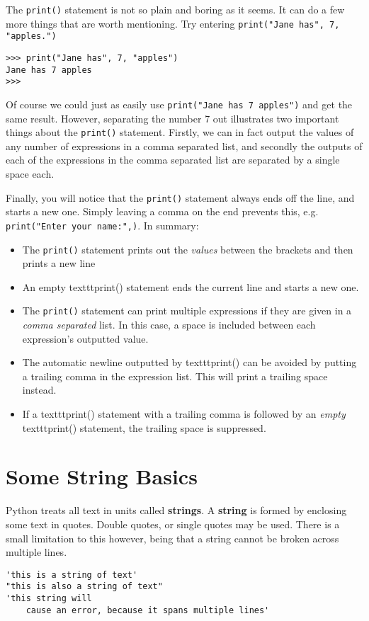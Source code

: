 The \texttt{print()} statement is not so plain and boring as it seems. It can   do a few more things that are worth mentioning. Try entering 
\texttt{print("Jane     has", 7, "apples.")}
\begin{lstlisting}
>>> print("Jane has", 7, "apples")
Jane has 7 apples
>>>
\end{lstlisting}

Of course we could just as easily use 
\texttt{print("Jane has 7   apples")} and get the same result. However, separating the number   7 out illustrates two important things about the \texttt{print()} statement.   Firstly, we can in fact output the values of any number of expressions   in a comma separated list, and secondly the outputs of each of the   expressions in the comma separated list are separated by a single space   each.

Finally, you will notice that the \texttt{print()} statement always ends off   the line, and starts a new one. Simply leaving a comma on the end   prevents this, e.g. 
\texttt{print("Enter your name:",)}. In summary:
\begin{itemize}
	\item The \texttt{print()} statement prints out the \textit{values}  between the     brackets and then prints a new line
	\item An empty texttt{print()} statement ends the current line and starts a new     one.
	\item The \texttt{print()} statement can print multiple expressions if they are     given in a \textit{comma separated} list. In this case, a space is     included between each expression's outputted value.
	\item The automatic newline outputted by texttt{print()} can be avoided by     putting a trailing comma in the expression list. This will print a     trailing space instead.
	\item If a texttt{print()} statement with a trailing comma is followed by an     \textit{empty} texttt{print()} statement, the trailing space is     suppressed.
\end{itemize}

\section{Some String Basics}

Python treats all text in units called \textbf{strings}. A \textbf{string} is formed   by enclosing some text in quotes. Double quotes, or single quotes may   be used. There is a small limitation to this however, being that a   string cannot be broken across multiple lines.
\begin{lstlisting}
'this is a string of text'
"this is also a string of text"
'this string will
    cause an error, because it spans multiple lines'
\end{lstlisting}

